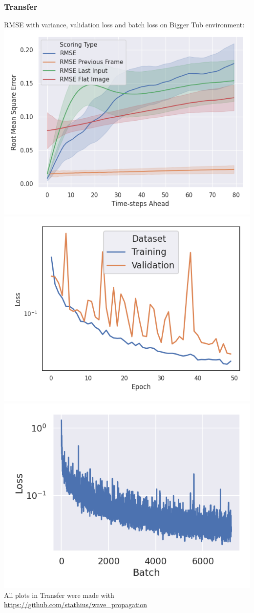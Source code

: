 \begin{frame}
    \frametitle{Transfer}

RMSE with variance, validation loss and batch loss on Bigger Tub environment:\\[\baselineskip]

\mbox{\includegraphics[height=.5\paperheight, width=.33\textwidth]{./Ressourcen/Praesentation/Bilder/WaveTransfer/DFP/Bigger_Tub_RMSE_Quality_start_15.png}}%
\mbox{\includegraphics[height=.5\paperheight, width=.33\textwidth]{./Ressourcen/Praesentation/Bilder/WaveTransfer/DFP/Validation_Loss.png}}
\mbox{\includegraphics[height=.5\paperheight, width=.33\textwidth]{./Ressourcen/Praesentation/Bilder/WaveTransfer/DFP/Batch_Loss.png}}
All plots in Transfer were made with \url{https://github.com/stathius/wave_propagation}
\end{frame}
\clearpage

